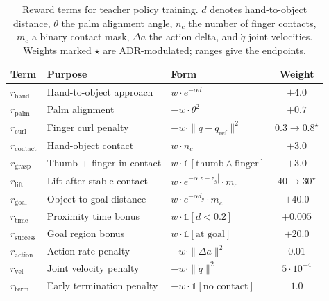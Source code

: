 \begin{table}[htb]
    \centering
    \caption{Reward terms for teacher policy training. $d$ denotes hand-to-object distance, $\theta$ the palm alignment angle, $n_c$ the number of finger contacts, $m_c$ a binary contact mask, $\Delta a$ the action delta, and $\dot{q}$ joint velocities. Weights marked $\star$ are ADR-modulated; ranges give the endpoints.}
    \label{tab:reward_terms}
    \small
    \begin{tabular}{lp{3.0cm}lc}
        \toprule
        \textbf{Term} & \textbf{Purpose} & \textbf{Form} & \textbf{Weight} \\
        \midrule
        $r_{\text{hand}}$    & Hand-to-object approach         & $w \cdot e^{-\alpha d}$             & $+4.0$ \\
        $r_{\text{palm}}$    & Palm alignment                  & $-w \cdot \theta^2$                 & $+0.7$ \\
        $r_{\text{curl}}$    & Finger curl penalty             & $-w \cdot \|q - q_{\text{ref}}\|^2$ & $0.3 \to 0.8^{\star}$ \\
        \midrule
        $r_{\text{contact}}$ & Hand-object contact             & $w \cdot n_c$                       & $+3.0$ \\
        $r_{\text{grasp}}$   & Thumb + finger in contact       & $w \cdot \mathbb{1}[\text{thumb} \wedge \text{finger}]$ & $+3.0$ \\
        $r_{\text{lift}}$    & Lift after stable contact       & $w \cdot e^{-\alpha |z - z_g|} \cdot m_c$ & $40 \to 30^{\star}$ \\
        $r_{\text{goal}}$    & Object-to-goal distance         & $w \cdot e^{-\alpha d_g} \cdot m_c$ & $+40.0$ \\
        $r_{\text{time}}$    & Proximity time bonus            & $w \cdot \mathbb{1}[d < 0.2]$       & $+0.005$ \\
        $r_{\text{success}}$ & Goal region bonus               & $w \cdot \mathbb{1}[\text{at goal}]$ & $+20.0$ \\
        \midrule
        $r_{\text{action}}$  & Action rate penalty             & $-w \cdot \|\Delta a\|^2$           & $0.01$ \\
        $r_{\text{vel}}$     & Joint velocity penalty          & $-w \cdot \|\dot{q}\|^2$           & $5 \!\cdot\! 10^{-4}$ \\
        $r_{\text{term}}$    & Early termination penalty       & $-w \cdot \mathbb{1}[\text{no contact}]$ & $1.0$ \\
        \bottomrule
    \end{tabular}
\end{table}

